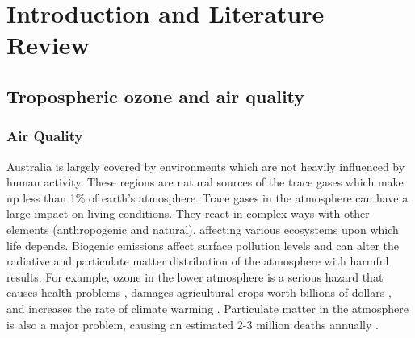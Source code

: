 
%
\chapter{Introduction and Literature Review} %
\label{LR}

\section{Tropospheric ozone and air quality}
  \label{LR:O3andAQ}
  \subsection{Air Quality}
    \label{LR:O3andAQ:AQ}
    Australia is largely covered by environments which are not heavily influenced by human activity.
    These regions are natural sources of the trace gases which make up less than 1\% of earth's atmosphere.
    Trace gases in the atmosphere can have a large impact on living conditions.
    They react in complex ways with other elements (anthropogenic and natural), affecting various ecosystems upon which life depends.
    Biogenic emissions affect surface pollution levels and can alter the radiative and particulate matter distribution of the atmosphere with harmful results.
    For example, ozone in the lower atmosphere is a serious hazard that causes health problems \citep{Hsieh2013}, damages agricultural crops worth billions of dollars \citep{Avnery2011}, and increases the rate of climate warming \citep{IPCC_2013_chap8}.
    Particulate matter in the atmosphere is also a major problem, causing an estimated 2-3 million deaths annually \citep{Hoek2013, Krewski2009, Silva2013, Lelieveld2015}. 
    
